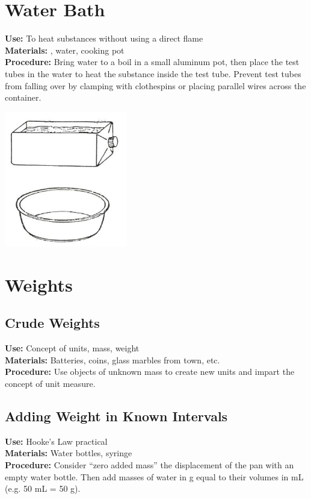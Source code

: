 \begin{multicols}{2}
\section{Water Bath}
\label{sec:hotwaterbathes}
\vspace{-10pt}
\textbf{Use:} To heat substances without using a direct flame\\
\textbf{Materials:} , water, cooking pot\\
\textbf{Procedure:} Bring water to a boil in a small aluminum pot, then place the test tubes in the water to heat the substance inside the test tube. Prevent test tubes from falling over by clamping with clothespins or placing parallel wires across the container.
\begin{center}
\includegraphics[width=0.4\textwidth]{./img/source/trough.jpg}
\end{center}

\section{Weights}
\label{sec:weights}

\subsection{Crude Weights}
\vspace{-6pt}
\textbf{Use:} Concept of units, mass, weight\\
\textbf{Materials:} Batteries, coins, glass marbles from town, etc. \\
\textbf{Procedure:} Use objects of unknown mass to create new units and impart the concept of unit measure.

\subsection{Adding Weight in Known Intervals}
\vspace{-6pt}
\textbf{Use:} Hooke's Law practical\\
\textbf{Materials:} Water bottles, syringe\\
\textbf{Procedure:} Consider ``zero added mass'' the displacement of the pan with an empty water bottle. Then add masses of water in g equal to their volumes in mL (e.g. 50 mL = 50 g).


\end{multicols}
